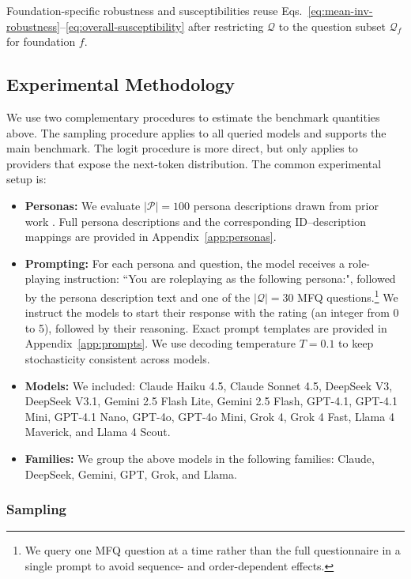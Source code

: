 \documentclass{article}
\begin{document}
Foundation-specific robustness and susceptibilities reuse Eqs.~\eqref{eq:mean-inv-robustness}--\eqref{eq:overall-susceptibility} after restricting \(\mathcal{Q}\) to the question subset \(\mathcal{Q}_f\) for foundation \(f\).

\subsection{Experimental Methodology}
\label{sec:experimental-methodology}
We use two complementary procedures to estimate the benchmark quantities above. The sampling procedure applies to all queried models and supports the main benchmark. The logit procedure is more direct, but only applies to providers that expose the next-token distribution. The common experimental setup is:

\begin{itemize}
  \item \textbf{Personas:} We evaluate $|\mathcal{P}|=100$ persona descriptions drawn from prior work \citep{ge2025scalingsyntheticdatacreation}. Full persona descriptions and the corresponding ID–description mappings are provided in Appendix~\ref{app:personas}.
  \item \textbf{Prompting:} For each persona and question, the model receives a role-playing instruction: ``You are roleplaying as the following persona:", followed by the persona description text and one of the $|\mathcal{Q}|=30$ MFQ questions.\footnote{We query one MFQ question at a time rather than the full questionnaire in a single prompt to avoid sequence- and order-dependent effects.} We instruct the models to start their response with the rating (an integer from 0 to 5), followed by their reasoning. Exact prompt templates are provided in Appendix~\ref{app:prompts}. We use decoding temperature $T=0.1$ to keep stochasticity consistent across models.
  \item \textbf{Models:} We included: Claude Haiku 4.5, Claude Sonnet 4.5, DeepSeek V3, DeepSeek V3.1, Gemini 2.5 Flash Lite, Gemini 2.5 Flash, GPT-4.1, GPT-4.1 Mini, GPT-4.1 Nano, GPT-4o, GPT-4o Mini, Grok 4, Grok 4 Fast, Llama 4 Maverick, and Llama 4 Scout.
  \item \textbf{Families:} We group the above models in the following families: Claude, DeepSeek, Gemini, GPT, Grok, and Llama.
\end{itemize}

\subsubsection{Sampling}
\end{document}
